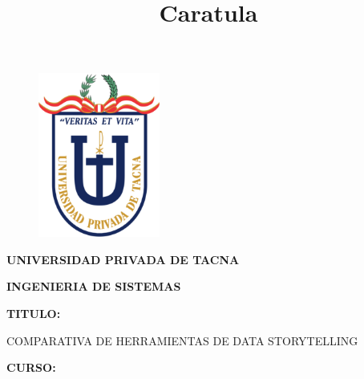\documentclass[12pt,letterpaper]{article}
\begin{document}
%


\title{Caratula}

\begin{titlepage}
\begin{center}
\begin{figure}[htb]
\begin{center}
\includegraphics[width=4cm]{./img/logo}
\end{center}
\end{figure}

\vspace*{0.15in}
\begin{Large}
\textbf{UNIVERSIDAD PRIVADA DE TACNA}\\
\end{Large}

\vspace*{0.1in}
\begin{Large}
\textbf{INGENIERIA DE SISTEMAS} \\
\end{Large}

\vspace*{0.5in}
\begin{Large}
\textbf{TITULO:}\\
\end{Large}

\vspace*{0.1in}
\begin{Large}
    COMPARATIVA DE HERRAMIENTAS DE DATA STORYTELLING \\
\end{Large}

\vspace*{0.3in}
\begin{Large}
\textbf{CURSO:} \\
\end{Large}


\end{center}
\end{titlepage}
\end{document}
